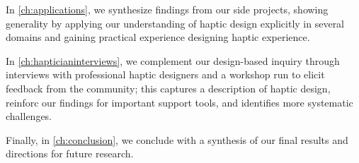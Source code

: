 In \autoref{ch:applications}, we synthesize findings from our side projects, showing generality by applying our understanding of haptic design explicitly in several domains and gaining practical experience designing haptic experience.

In \autoref{ch:hapticianinterviews}, we complement our design-based inquiry through interviews with professional haptic designers and a workshop run to elicit feedback from the community; this captures a description of haptic design, reinforc our findings for important support tools, and identifies more systematic challenges.

Finally, in \autoref{ch:conclusion}, we conclude with a synthesis of our final results and directions for future research.


%
%
\endinput

Any text after an \endinput is ignored.
You could put scraps here or things in progress.
